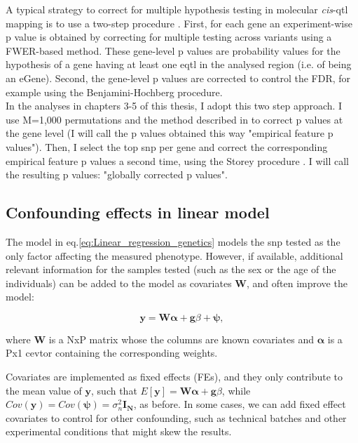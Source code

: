 A typical strategy to correct for multiple hypothesis testing in molecular \textit{cis}-\gls{qtl} mapping is to use a two-step procedure \cite{gtex2015genotype}. 
First, for each gene an experiment-wise p value is obtained by correcting for multiple testing across variants using a FWER-based method. 
These gene-level p values are probability values for the hypothesis of a gene having at least one e\gls{qtl} in the analysed region (i.e. of being an eGene). 
Second, the gene-level p values are corrected to control the FDR, for example using the Benjamini-Hochberg procedure.\\

In the analyses in chapters 3-5 of this thesis, I adopt this two step approach.
I use M=1,000 permutations and the method described in \cite{ongen2016fast} to correct p values at the gene level (I will call the p values obtained this way "empirical feature p values").
Then, I select the top \gls{snp} per gene and correct the corresponding empirical feature p values a second time, using the Storey procedure \cite{storey2002direct}.
I will call the resulting p values: "globally corrected p values".

\subsection{Confounding effects in linear model}

The model in eq.\eqref{eq:Linear_regression_genetics} models the \gls{snp} tested as the only factor affecting the measured phenotype.
However, if available, additional relevant information for the samples tested (such as the sex or the age of the individuals) can be added to the model as covariates $\mathbf{W}$, and often improve the model:

\begin{equation}\label{eq:Linear_regression_genetics_covariates}
 \mathbf{y} =  \mathbf{W}\boldsymbol{\alpha} + \mathbf{g}\beta + \boldsymbol{\psi}, 
\end{equation}

where $\mathbf{W}$ is a NxP matrix whose the columns are known covariates and $\boldsymbol{\alpha}$ is a Px1 cevtor containing the corresponding weights.

Covariates are implemented as fixed effects (FEs), and they only contribute to the mean value of $\mathbf{y}$, such that $E[\mathbf{y}] = \mathbf{W}\boldsymbol{\alpha} + \mathbf{g}\beta$, while $Cov(\mathbf{y}) = Cov(\boldsymbol{\psi}) = \sigma_n^2 \mathbf{I_N} $, as before.
In some cases, we can add fixed effect covariates to control for other confounding, such as technical batches and other experimental conditions that might skew the results. \\

